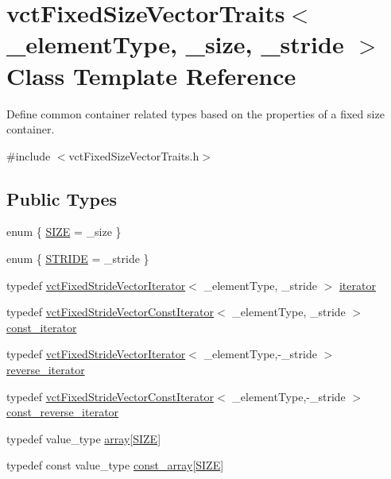 \hypertarget{classvct_fixed_size_vector_traits}{}\section{vct\+Fixed\+Size\+Vector\+Traits$<$ \+\_\+element\+Type, \+\_\+size, \+\_\+stride $>$ Class Template Reference}
\label{classvct_fixed_size_vector_traits}


Define common container related types based on the properties of a fixed size container.  




{\ttfamily \#include $<$vct\+Fixed\+Size\+Vector\+Traits.\+h$>$}

\subsection*{Public Types}
\begin{DoxyCompactItemize}
\item 
enum \{ \hyperlink{classvct_fixed_size_vector_traits_a47888b1140c58261aa5df8f3440b527eac93e9bcd3ebe92f3bc7d9f34e8a47b94}{S\+I\+Z\+E} = \+\_\+size
 \}
\item 
enum \{ \hyperlink{classvct_fixed_size_vector_traits_ac698cfb1928dc4e54893e2cb1f658afba4be4dfff5fff04a513ed92c80f0201e9}{S\+T\+R\+I\+D\+E} = \+\_\+stride
 \}
\item 
typedef \hyperlink{classvct_fixed_stride_vector_iterator}{vct\+Fixed\+Stride\+Vector\+Iterator}$<$ \+\_\+element\+Type, \+\_\+stride $>$ \hyperlink{classvct_fixed_size_vector_traits_a4c4cff693ac7f81edfb240a208506309}{iterator}
\item 
typedef \hyperlink{classvct_fixed_stride_vector_const_iterator}{vct\+Fixed\+Stride\+Vector\+Const\+Iterator}$<$ \+\_\+element\+Type, \+\_\+stride $>$ \hyperlink{classvct_fixed_size_vector_traits_a9c7e38590e4a27350095e89a84dc0d09}{const\+\_\+iterator}
\item 
typedef \hyperlink{classvct_fixed_stride_vector_iterator}{vct\+Fixed\+Stride\+Vector\+Iterator}$<$ \+\_\+element\+Type,-\/\+\_\+stride $>$ \hyperlink{classvct_fixed_size_vector_traits_a46a61657ee7bece7277e0b59c4e0ea41}{reverse\+\_\+iterator}
\item 
typedef \hyperlink{classvct_fixed_stride_vector_const_iterator}{vct\+Fixed\+Stride\+Vector\+Const\+Iterator}$<$ \+\_\+element\+Type,-\/\+\_\+stride $>$ \hyperlink{classvct_fixed_size_vector_traits_a66365350e5fae26c9cf29a3ce0bb4a60}{const\+\_\+reverse\+\_\+iterator}
\item 
typedef value\+\_\+type \hyperlink{classvct_fixed_size_vector_traits_ab86355023bee9fbca9ee14640c6b7f4e}{array}\mbox{[}\hyperlink{classvct_fixed_size_vector_traits_a47888b1140c58261aa5df8f3440b527eac93e9bcd3ebe92f3bc7d9f34e8a47b94}{S\+I\+Z\+E}\mbox{]}
\item 
typedef const value\+\_\+type \hyperlink{classvct_fixed_size_vector_traits_acb808c545eef4de1bdcd7b8c4f71b1ce}{const\+\_\+array}\mbox{[}\hyperlink{classvct_fixed_size_vector_traits_a47888b1140c58261aa5df8f3440b527eac93e9bcd3ebe92f3bc7d9f34e8a47b94}{S\+I\+Z\+E}\mbox{]}
\end{DoxyCompactItemize}

